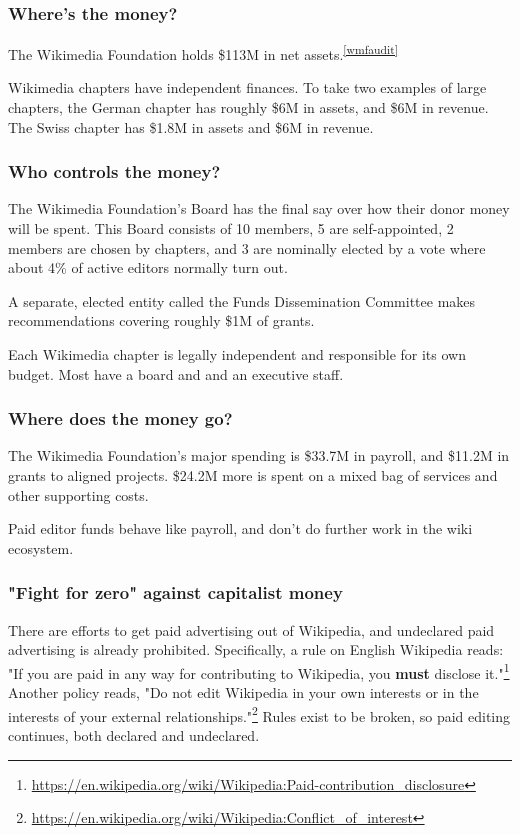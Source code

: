 \documentclass[format=sigconf, authorversion]{acmart}
\begin{document}
\subsubsection{Where's the money?}

The Wikimedia Foundation holds \$113M in net assets.\textsuperscript{\ref{wmfaudit}}

Wikimedia chapters have independent finances.  To take two examples of large chapters, the German chapter has roughly \$6M in assets, and \$6M in revenue.  The Swiss chapter has \$1.8M in assets and \$6M in revenue.

\subsubsection{Who controls the money?}

The Wikimedia Foundation's Board has the final say over how their donor money will be spent.  This Board consists of 10 members, 5 are self-appointed, 2 members are chosen by chapters, and 3 are nominally elected by a vote where about 4\% of active editors normally turn out.

A separate, elected entity called the Funds Dissemination Committee makes recommendations covering roughly \$1M of grants.

Each Wikimedia chapter is legally independent and responsible for its own budget.  Most have a board and and an executive staff.

\subsubsection{Where does the money go?}

The Wikimedia Foundation's major spending is \$33.7M in payroll, and \$11.2M in grants to aligned projects.  \$24.2M more is spent on a mixed bag of services and other supporting costs.

Paid editor funds behave like payroll, and don't do further work in the wiki ecosystem.

\subsubsection{"Fight for zero" against capitalist money}

There are efforts to get paid advertising out of Wikipedia, and undeclared paid advertising is already prohibited.  Specifically, a rule on English Wikipedia reads: "If you are paid in any way for contributing to Wikipedia, you \textbf{must} disclose it."\footnote{\url{https://en.wikipedia.org/wiki/Wikipedia:Paid-contribution_disclosure}} Another policy reads, "Do not edit Wikipedia in your own interests or in the interests of your external relationships."\footnote{\url{https://en.wikipedia.org/wiki/Wikipedia:Conflict_of_interest}} Rules exist to be broken, so paid editing continues, both declared and undeclared.
\end{document}
